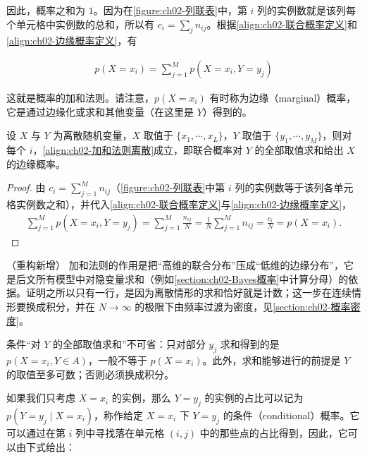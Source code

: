 \documentclass[../../main.tex]{subfiles}
\begin{document}
因此，概率之和为 $1$。因为在\cref{figure:ch02-列联表}中，第 $i$ 列的实例数就是该列每个单元格中实例数的总和，所以有 $c_i=\sum_j n_{ij}$。根据\eqref{align:ch02-联合概率定义}和\eqref{align:ch02-边缘概率定义}，有

\begin{align}
  p(X=x_i) = \sum_{j=1}^{M} p(X=x_i,Y=y_j)
  \label{align:ch02-加和法则离散}
\end{align}

这就是概率的加和法则。请注意，$p(X=x_i)$ 有时称为边缘（marginal）概率，它是通过边缘化或求和其他变量（在这里是 $Y$）得到的。

\begin{proposition}\label{proposition:ch02-加和法则离散}
设 $X$ 与 $Y$ 为离散随机变量，$X$ 取值于 $\{x_1,\cdots,x_L\}$，$Y$ 取值于 $\{y_1,\cdots,y_M\}$，则对每个 $i$，\eqref{align:ch02-加和法则离散}成立，即联合概率对 $Y$ 的全部取值求和给出 $X$ 的边缘概率。
\end{proposition}

\begin{proof}
由 $c_i=\sum_{j=1}^{M}n_{ij}$（\cref{figure:ch02-列联表}中第 $i$ 列的实例数等于该列各单元格实例数之和），并代入\eqref{align:ch02-联合概率定义}与\eqref{align:ch02-边缘概率定义}，
\begin{align*}
  \sum_{j=1}^{M} p(X=x_i,Y=y_j) = \sum_{j=1}^{M}\frac{n_{ij}}{N} = \frac{1}{N}\sum_{j=1}^{M}n_{ij} = \frac{c_i}{N} = p(X=x_i) .
\end{align*}
\end{proof}

\begin{remark}（重构新增）
加和法则的作用是把“高维的联合分布”压成“低维的边缘分布”，它是后文所有模型中对隐变量求和（例如\cref{section:ch02-Bayes概率}中计算分母）的依据。证明之所以只有一行，是因为离散情形的求和恰好就是计数；这一步在连续情形要换成积分，并在 $N\to\infty$ 的极限下由频率过渡为密度，见\cref{section:ch02-概率密度}。

条件“对 $Y$ 的全部取值求和”不可省：只对部分 $y_j$ 求和得到的是 $p(X=x_i,Y\in A)$，一般不等于 $p(X=x_i)$。此外，求和能够进行的前提是 $Y$ 的取值至多可数；否则必须换成积分。
\end{remark}

如果我们只考虑 $X=x_i$ 的实例，那么 $Y=y_j$ 的实例的占比可以记为 $p(Y=y_j\mid X=x_i)$，称作给定 $X=x_i$ 下 $Y=y_j$ 的条件（conditional）概率。它可以通过在第 $i$ 列中寻找落在单元格 $(i,j)$ 中的那些点的占比得到，因此，它可以由下式给出：
\end{document}
